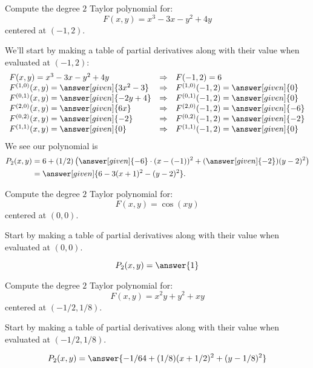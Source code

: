 \documentclass{ximera}
\begin{document}
\begin{example}
  Compute the degree $2$ Taylor polynomial for:
  \[
  F(x,y)= x^3-3x-y^2+4y
  \]
  centered at $(-1,2)$.
  \begin{explanation}
    We'll start by making a table of partial derivatives along with
    their value when evaluated at $(-1,2)$:
    \[
    \begin{array}{lcl}
      F(x,y) = x^3-3x-y^2+4y & \Rightarrow &F(-1,2) = 6\\
      F^{(1,0)}(x,y) = \answer[given]{3x^2-3} & \Rightarrow & F^{(1,0)}(-1,2) = \answer[given]{0}\\
      F^{(0,1)}(x,y) = \answer[given]{-2y+4} &\Rightarrow  & F^{(0,1)}(-1,2) = \answer[given]{0}\\
      F^{(2,0)}(x,y) = \answer[given]{6x} &\Rightarrow & F^{(2,0)}(-1,2) = \answer[given]{-6}\\
      F^{(0,2)}(x,y) = \answer[given]{-2} &\Rightarrow & F^{(0,2)}(-1,2) = \answer[given]{-2}\\
      F^{(1,1)}(x,y) = \answer[given]{0} &\Rightarrow & F^{(1,1)}(-1,2) = \answer[given]{0}
    \end{array}
    \]
    We see our polynomial is
    \begin{align*}
      P_2(x,y) &= 6 + (1/2)\left(\answer[given]{-6}\cdot (x-(-1))^2 +  (\answer[given]{-2})(y-2)^2 \right)\\
      &= \answer[given]{6-3(x+1)^2-(y-2)^2}.
    \end{align*}
  \end{explanation}
\end{example}

\begin{question}
  Compute the degree $2$ Taylor polynomial for:
  \[
  F(x,y)=\cos(xy)
  \]
  centered at $(0,0)$.
  \begin{hint}
    Start by making a table of partial derivatives along with
    their value when evaluated at $(0,0)$.
  \end{hint}
    \begin{prompt}
    \[
    P_2(x,y) = \answer{1}
    \]
  \end{prompt}
\end{question}

\begin{question}
  Compute the degree $2$ Taylor polynomial for:
  \[
  F(x,y)= x^2 y + y^2 + x y
  \]
  centered at $(-1/2,1/8)$.
  \begin{hint}
    Start by making a table of partial derivatives along with
    their value when evaluated at $(-1/2,1/8)$.
  \end{hint}
  \begin{prompt}
    \[
    P_2(x,y) = \answer{-1/64 + (1/8)(x+1/2)^2+(y-1/8)^2}
    \]
  \end{prompt}
\end{question}
\end{document}
